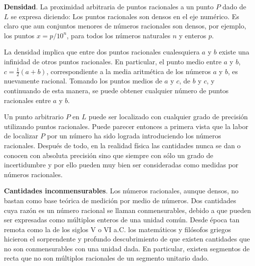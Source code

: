 \documentclass[12pt]{book}
\theoremstyle{definition}
\begin{document}
\textbf{Densidad}. La proximidad arbitraria de puntos racionales a un punto $P$ dado de $L$ se expresa diciendo: Los puntos racionales son densos en el eje numérico. Es claro que aun conjuntos menores de números racionales son densos, por ejemplo, los puntos $x = p/10^n$, para todos los números naturales $n$ y enteros $p$.

La densidad implica que entre dos puntos racionales cualesquiera $a$ y $b$ existe una infinidad de otros puntos racionales. En particular, el punto medio entre $a$ y $b$, $c = \frac{1}{2}(a + b)$, correspondiente a la media aritmética de los números $a$ y $b$, es nuevamente racional. Tomando los puntos medios de $a$ y $c$, de $b$ y $c$, y continuando de esta manera, se puede obtener cualquier número de puntos racionales entre $a$ y $b$.

Un punto arbitrario $P$ en $L$ puede ser localizado con cualquier grado de precisión utilizando puntos racionales. Puede parecer entonces a primera vista que la labor de localizar $P$ por un número ha sido lograda introduciendo los números racionales. Después de todo, en la realidad física las cantidades nunca se dan o conocen con absoluta precisión sino que siempre con sólo un grado de incertidumbre y por ello pueden muy bien ser consideradas como medidas por números racionales.

\textbf{Cantidades inconmensurables}. Los números racionales, aunque densos, no bastan como base teórica de medición por medio de números. Dos cantidades cuya razón es un número racional se llaman conmensurables, debido a que pueden ser expresadas como múltiplos enteros de una unidad común. Desde época tan remota como la de los siglos V o VI a.C. los matemáticos y filósofos griegos hicieron el sorprendente y profundo descubrimiento de que existen cantidades que no son conmensurables con una unidad dada. En particular, existen segmentos de recta que no son múltiplos racionales de un segmento unitario dado.
\end{document}
